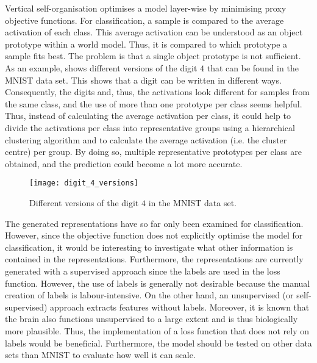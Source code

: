 Vertical self-organisation optimises a model layer-wise by minimising proxy objective functions.
For classification, a sample is compared to the average activation of each class. This average activation can be understood as an object prototype within a world model. Thus, it is compared to which prototype a sample fits best. The problem is that a single object prototype is not sufficient. As an example,  shows different versions of the digit $4$ that can be found in the MNIST data set. This shows that a digit can be written in different ways.
Consequently, the digits and, thus, the activations look different for samples from the same class, and the use of more than one prototype per class seems helpful. Thus, instead of calculating the average activation per class, it could help to divide the activations per class into representative groups using a hierarchical clustering algorithm and to calculate the average activation (i.e. the cluster centre) per group. By doing so, multiple representative prototypes per class are obtained, and the prediction could become a lot more accurate.

\begin{figure}[h]
    \centering
    \texttt{[image: digit\_4\_versions]}
    \caption[Different versions of the digit $4$ in the MNIST data set]{Different versions of the digit $4$ in the MNIST data set.}
\end{figure}


The generated representations have so far only been examined for classification. However, since the objective function does not explicitly optimise the model for classification, it would be interesting to investigate what other information is contained in the representations. Furthermore, the representations are currently generated with a supervised approach since the labels are used in the loss function. However, the use of labels is generally not desirable because the manual creation of labels is labour-intensive. On the other hand, an unsupervised (or self-supervised) approach extracts features without labels. Moreover, it is known that the brain also functions unsupervised to a large extent and is thus biologically more plausible.
Thus, the implementation of a loss function that does not rely on labels would be beneficial. Furthermore, the model should be tested on other data sets than MNIST to evaluate how well it can scale.

